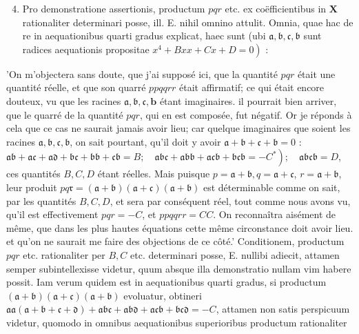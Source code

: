 \documentclass[10pt]{article}
\begin{document}
\begin{enumerate}
  \setcounter{enumi}{3}
  \item Pro demonstratione assertionis, productum \(p q r\) etc. ex coëfficientibus in \(\mathbf{X}\) rationaliter determinari posse, ill. E. nihil omnino attulit. Omnia, quae hac de re in aequationibus quarti gradus explicat, haec sunt (ubi \(\mathfrak{a}, \mathfrak{b}, \mathfrak{c}, \mathfrak{b}\) sunt radices aequationis propositae \(\left.x^{4}+B x x+C x+D=0\right)\) :
\end{enumerate}

'On m'objectera sans doute, que j'ai supposé ici, que la quantité \(p q r\) était une quantité réelle, et que son quarré \(p p q q r r\) était affirmatif; ce qui était encore douteux, vu que les racines \(\mathfrak{a}, \mathfrak{b}, \mathfrak{c}, \boldsymbol{b}\) étant imaginaires. il pourrait bien arriver, que le quarré de la quantité \(p q r\), qui en est composée, fut négatif. Or je réponds à cela que ce cas ne saurait jamais avoir lieu; car quelque imaginaires que soient les racines \(\mathfrak{a}, \mathfrak{b}, \mathfrak{c}, \mathfrak{b}\), on sait pourtant, qu'il doit y avoir \(\mathfrak{a}+\mathfrak{b}+\mathfrak{c}+\mathfrak{b}=0\) : \(\left.\mathfrak{a} \mathfrak{b}+\mathfrak{a} \mathfrak{c}+\mathfrak{a} \mathfrak{d}+\mathfrak{b} \mathfrak{c}+\mathfrak{b} \mathfrak{b}+\mathfrak{c} \mathfrak{b}=B ; \quad \mathfrak{a} \mathfrak{b} \mathfrak{c}+\mathfrak{a} \mathfrak{b} \mathfrak{b}+\mathfrak{a} \mathfrak{c} \mathfrak{b}+\mathfrak{b} \mathfrak{c} \mathfrak{b}=-C^{*}\right) ; \quad \mathfrak{a} \mathfrak{b} \mathfrak{c} \mathfrak{b}=D\), ces quantités \(B, C, D\) étant réelles. Mais puisque \(p=\mathfrak{a}+\mathfrak{b}, q=\mathfrak{a}+\mathfrak{c}\), \(r=\mathfrak{a}+\mathfrak{b}\), leur produit \(p q \mathfrak{r}=(\mathfrak{a}+\mathfrak{b})(\mathfrak{a}+\mathfrak{c})(\mathfrak{a}+\mathfrak{b})\) est déterminable comme on sait, par les quantités \(B, C, D\), et sera par conséquent réel, tout comme nous avons vu, qu'il est effectivement \(p q r=-C\), et \(p p q q r r=C C\). On reconnaîtra aisément de même, que dans les plus hautes équations cette même circonstance doit avoir lieu. et qu'on ne saurait me faire des objections de ce côté.' Conditionem, productum \(p q r\) etc. rationaliter per \(B, C\) etc. determinari posse, E. nullibi adiecit, attamen semper subintellexisse videtur, quum absque illa demonstratio nullam vim habere possit. Iam verum quidem est in aequationibus quarti gradus, si productum \((\mathfrak{a}+\mathfrak{b})(\mathfrak{a}+\mathfrak{c})(\mathfrak{a}+\mathfrak{b})\) evoluatur, obtineri \(\mathfrak{a} \mathfrak{a}(\mathfrak{a}+\mathfrak{b}+\mathfrak{c}+\mathfrak{d})+\mathfrak{a} \mathfrak{b} \mathfrak{c}+\mathfrak{a} \mathfrak{b} \mathfrak{d}+\mathfrak{a} \mathfrak{c} \mathfrak{b}+\mathfrak{b} \mathfrak{c} \mathfrak{d}=-C\), attamen non satis perspicuum videtur, quomodo in omnibus aequationibus superioribus productum rationaliter
\end{document}
